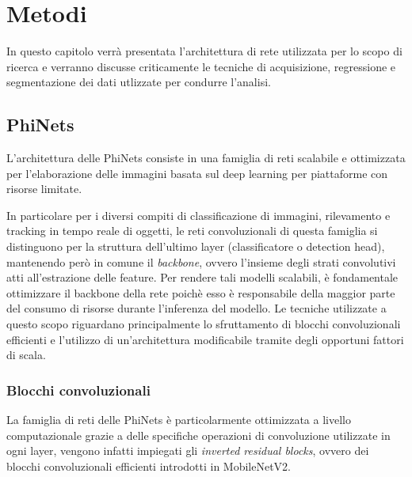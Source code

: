 \chapter{Metodi}
\label{cha:metodi}

In questo capitolo verrà presentata l'architettura di rete utilizzata per lo scopo di ricerca e verranno discusse criticamente le tecniche di acquisizione, regressione e segmentazione dei dati utlizzate per condurre l'analisi.


\section{PhiNets}
\label{sec:phinet}

L'architettura delle PhiNets consiste in una famiglia di reti scalabile e ottimizzata per l’elaborazione delle immagini basata sul deep learning per piattaforme con risorse limitate. \cite{10.1145/3510832}

In particolare per i diversi compiti di classificazione di immagini, rilevamento e tracking in tempo reale di oggetti, le reti convoluzionali di questa famiglia si distinguono per la struttura dell'ultimo layer (classificatore o detection head), mantenendo però in comune il \textit{backbone}, ovvero l'insieme degli strati convolutivi atti all'estrazione delle feature. Per rendere tali modelli scalabili, è fondamentale ottimizzare il backbone della rete poichè esso è responsabile della maggior parte del consumo di risorse durante l'inferenza del modello. Le tecniche utilizzate a questo scopo riguardano principalmente lo sfruttamento di blocchi convoluzionali efficienti e l'utilizzo di un'architettura modificabile tramite degli opportuni fattori di scala.


\subsection{Blocchi convoluzionali}
La famiglia di reti delle PhiNets è particolarmente ottimizzata a livello computazionale grazie a delle specifiche operazioni di convoluzione utilizzate in ogni layer, vengono infatti impiegati gli \textit{inverted residual blocks}, ovvero dei blocchi convoluzionali efficienti introdotti in MobileNetV2. \cite{mobilenetv2}

